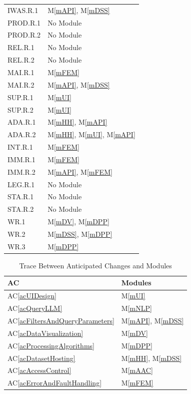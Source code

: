 \documentclass[12pt, titlepage]{article}
\newcommand{\acref}[1]{AC\ref{#1}}
\newcommand{\mref}[1]{M\ref{#1}}
\begin{document}
\begin{longtable}{p{} p{}}
IWAS.R.1 & \mref{mAPI}, \mref{mDSS} \\
PROD.R.1 & No Module \\
PROD.R.2 & No Module \\
REL.R.1  & No Module \\
REL.R.2  & No Module \\
MAI.R.1  & \mref{mFEM} \\
MAI.R.2  & \mref{mAPI}, \mref{mDSS} \\
SUP.R.1  & \mref{mUI} \\
SUP.R.2  & \mref{mUI} \\
ADA.R.1  & \mref{mHH}, \mref{mAPI} \\
ADA.R.2  & \mref{mHH}, \mref{mUI}, \mref{mAPI} \\
INT.R.1  & \mref{mFEM} \\
IMM.R.1  & \mref{mFEM} \\
IMM.R.2  & \mref{mAPI}, \mref{mFEM} \\
LEG.R.1  & No Module \\
STA.R.1  & No Module \\
STA.R.2  & No Module \\
WR.1     & \mref{mDV}, \mref{mDPP} \\
WR.2     & \mref{mDSS}, \mref{mDPP} \\
WR.3     & \mref{mDPP} \\

\end{longtable}


\begin{table}[H]
\centering
\begin{tabular}{p{} p{}}
\toprule
\textbf{AC} & \textbf{Modules}\\
\midrule
\acref{acUIDesign} & \mref{mUI}\\
\acref{acQueryLLM} & \mref{mNLP}\\
\acref{acFiltersAndQueryParameters} & \mref{mAPI}, \mref{mDSS}\\
\acref{acDataVisualization} & \mref{mDV}\\
\acref{acProcessingAlgorithms} & \mref{mDPP}\\
\acref{acDatasetHosting} & \mref{mHH}, \mref{mDSS}\\
\acref{acAccessControl} & \mref{mAAC}\\
\acref{acErrorAndFaultHandling} & \mref{mFEM}\\

\bottomrule
\end{tabular}
\caption{Trace Between Anticipated Changes and Modules}
\label{TblACT}
\end{table}
\end{document}
